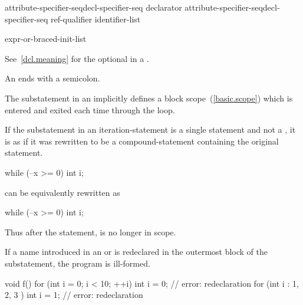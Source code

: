 \begin{bnf}
\br
    attribute-specifier-seq\opt decl-specifier-seq declarator\br
    attribute-specifier-seq\opt decl-specifier-seq ref-qualifier\opt{} \terminal{[} identifier-list \terminal{]}
\end{bnf}

\begin{bnf}
\br
    expr-or-braced-init-list
\end{bnf}

See~\ref{dcl.meaning} for the optional  in a
.
\begin{note}
An  ends with a semicolon.
\end{note}

\pnum
The substatement in an  implicitly defines
a block scope~(\ref{basic.scope}) which is entered and exited each time
through the loop.

%
If the substatement in an iteration-statement is a single statement and
not a , it is as if it was rewritten to be
a compound-statement containing the original statement.
\begin{example}

\begin{codeblock}
while (--x >= 0)
  int i;
\end{codeblock}

can be equivalently rewritten as

\begin{codeblock}
while (--x >= 0) {
  int i;
}
\end{codeblock}

Thus after the  statement,  is no longer in scope.
\end{example}

\pnum
If a name introduced in an
 or 
is redeclared in the outermost block of the substatement, the program is ill-formed.
\begin{example}
\begin{codeblock}
void f() {
  for (int i = 0; i < 10; ++i)
    int i = 0;          // error: redeclaration
  for (int i : { 1, 2, 3 })
    int i = 1;          // error: redeclaration
}
\end{codeblock}
\end{example}

